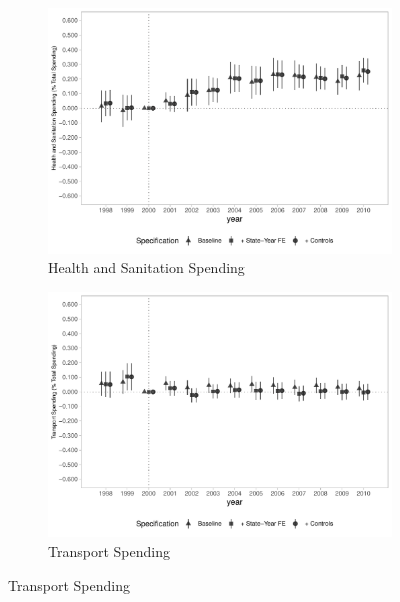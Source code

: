 \begin{figure}[h]
    \begin{center}
    \caption{Causal Effects on Public Spending (\% of Total Spending) - By Category}\label{fig:finbra4}
    \begin{subfigure}{0.32\textwidth}
        \caption{\scriptsize Health and Sanitation Spending}\label{fig:finbra4_a}
        \centering
        \includegraphics[width=\textwidth]{plots/spending/finbra_desp_saude_san_share_dist_ec29_baseline_dist_ec29_baseline_full.pdf}
    \end{subfigure}
    \begin{subfigure}{0.32\textwidth}
        \centering
        \caption{\scriptsize Transport Spending}\label{fig:finbra4_b}
        \includegraphics[width=\textwidth]{plots/spending/finbra_desp_transporte_share_dist_ec29_baseline_dist_ec29_baseline_full.pdf}

\end{subfigure}
\end{center}
\end{figure}
